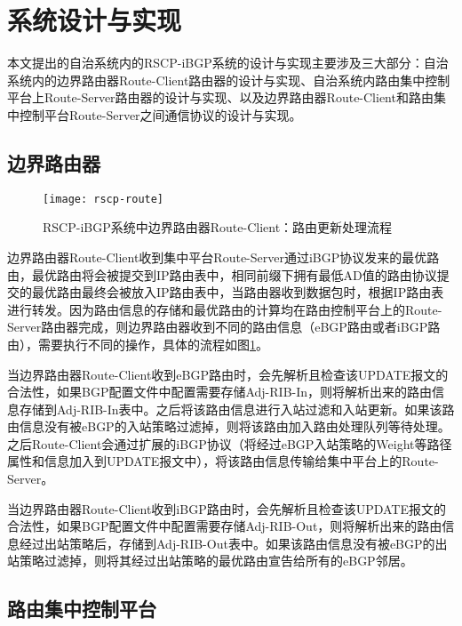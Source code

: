 \section{系统设计与实现}


本文提出的自治系统内的RSCP-iBGP系统的设计与实现主要涉及三大部分：自治系统内的边界路由器Route-Client路由器的设计与实现、自治系统内路由集中控制平台上Route-Server路由器的设计与实现、以及边界路由器Route-Client和路由集中控制平台Route-Server之间通信协议的设计与实现。


\subsection{边界路由器}

\begin{figure}
  \centering
  \texttt{[image: rscp-route]}
  \caption{RSCP-iBGP系统中边界路由器Route-Client：路由更新处理流程}
  \label{fig:rscp-route}
\end{figure}



边界路由器Route-Client收到集中平台Route-Server通过iBGP协议发来的最优路由，最优路由将会被提交到IP路由表中，相同前缀下拥有最低AD值的路由协议提交的最优路由最终会被放入IP路由表中，当路由器收到数据包时，根据IP路由表进行转发\cite{DianeTeare2016CCNP}。因为路由信息的存储和最优路由的计算均在路由控制平台上的Route-Server路由器完成，则边界路由器收到不同的路由信息（eBGP路由或者iBGP路由），需要执行不同的操作，具体的流程如图\ref{fig:rscp-route}。

当边界路由器Route-Client收到eBGP路由时，会先解析且检查该UPDATE报文的合法性，如果BGP配置文件中配置需要存储Adj-RIB-In，则将解析出来的路由信息存储到Adj-RIB-In表中。之后将该路由信息进行入站过滤和入站更新。如果该路由信息没有被eBGP的入站策略过滤掉，则将该路由加入路由处理队列等待处理。之后Route-Client会通过扩展的iBGP协议（将经过eBGP入站策略的Weight等路径属性和信息加入到UPDATE报文中），将该路由信息传输给集中平台上的Route-Server。

当边界路由器Route-Client收到iBGP路由时，会先解析且检查该UPDATE报文的合法性，如果BGP配置文件中配置需要存储Adj-RIB-Out，则将解析出来的路由信息经过出站策略后，存储到Adj-RIB-Out表中。如果该路由信息没有被eBGP的出站策略过滤掉，则将其经过出站策略的最优路由宣告给所有的eBGP邻居。



\subsection{路由集中控制平台}


